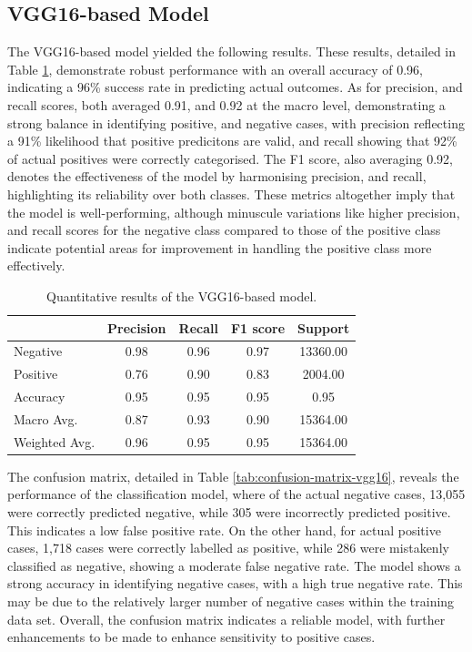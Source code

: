 \documentclass[../main]{subfiles}
\begin{document}
\clearpage

\subsection{VGG16-based Model}
The VGG16-based model yielded the following results. These results, detailed in Table \ref{tab:quantitative-results-vgg16}, demonstrate robust performance with an overall accuracy of 0.96, indicating a 96\% success rate in predicting actual outcomes. As for precision, and recall scores, both averaged 0.91, and 0.92 at the macro level, demonstrating a strong balance in identifying positive, and negative cases, with precision reflecting a 91\% likelihood that positive predicitons are valid, and recall showing that 92\% of actual positives were correctly categorised. The F1 score, also averaging 0.92, denotes the effectiveness of the model by harmonising precision, and recall, highlighting its reliability over both classes. These metrics altogether imply that the model is well-performing, although minuscule variations like higher precision, and recall scores for the negative class compared to those of the positive class indicate potential areas for improvement in handling the positive class more effectively.

\begin{table}[h!]
    \centering
    \begin{tabular}{|l|c|c|c|c|}
        \hline
         & Precision & Recall & F1 score & Support \\ \hline
        Negative & 0.98 & 0.96 & 0.97 & 13360.00 \\ \hline
        Positive & 0.76 & 0.90 & 0.83 & 2004.00 \\ \hline
        Accuracy & 0.95 & 0.95 & 0.95 & 0.95 \\ \hline
        Macro Avg. & 0.87 & 0.93 & 0.90 & 15364.00 \\ \hline
        Weighted Avg. & 0.96 & 0.95 & 0.95 & 15364.00 \\ \hline
    \end{tabular}
    \caption{Quantitative results of the VGG16-based model.}
    \label{tab:quantitative-results-vgg16}
\end{table}

\noindent The confusion matrix, detailed in Table \ref{tab:confusion-matrix-vgg16}, reveals the performance of the classification model, where of the actual negative cases, 13,055 were correctly predicted negative, while 305 were incorrectly predicted positive. This indicates a low false positive rate. On the other hand, for actual positive cases, 1,718 cases were correctly labelled as positive, while 286 were mistakenly classified as negative, showing a moderate false negative rate. The model shows a strong accuracy in identifying negative cases, with a high true negative rate. This may be due to the relatively larger number of negative cases within the training data set. Overall, the confusion matrix indicates a reliable model, with further enhancements to be made to enhance sensitivity to positive cases.
\end{document}
